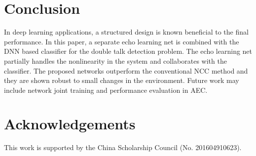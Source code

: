 \documentclass[a4paper]{article}
\begin{document}





\section{Conclusion}

In deep learning applications, a structured design is known beneficial to the final performance. In this paper, a separate echo learning net is combined with the DNN based classifier for the double talk detection problem. The echo learning net partially handles the nonlinearity in the system and collaborates with the classifier. The proposed networks outperform the conventional NCC method and they are shown robust to small changes in the environment. Future work may include network joint training and performance evaluation in AEC.


\section{Acknowledgements}

This work is supported by the China Scholarship Council (No. 201604910623). 





\end{document}
